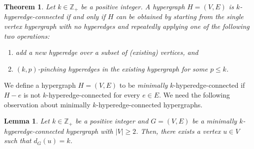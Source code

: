 \documentclass{article}
\def\Cref#1{<#1>}%
\newtheorem{lemma}{Lemma}[section]
\newtheorem{theorem}{Theorem}[section]
\providecommand{\Z}{\mathbb{Z}}
\begin{document}
\begin{theorem}\label{thm:k-EC-hypergraph-characterization}
    Let $k \in \Z_+$ be a positive integer. A hypergraph $H = (V, E)$ is $k$-hyperedge-connected if and only if $H$ can be obtained by starting from the single vertex hypergraph with no hyperedges and repeatedly applying one of the following two operations:
    \begin{enumerate}
        \item add a new hyperedge over a subset of (existing) vertices, and
        \item $(k, p)$-pinching hyperedges in the existing hypergraph for some $p \leq k$.
    \end{enumerate}
\end{theorem}
\fi
We define a hypergraph $H = (V, E)$ to be \emph{minimally} $k$-hyperedge-connected if $H-e$ is not $k$-hyperedge-connected for every $e\in E$. 
We need the following observation about minimally $k$-hyperedge-connected hypergraphs. %
\begin{lemma}\label{lem:minimally-k-EC-hypergraph-has-degree-k-vertex}
    Let $k \in \Z_+$ be a positive integer and $G = (V, E)$ be a minimally $k$-hyperedge-connected hypergraph with $|V| \geq 2$. Then, there exists a vertex $u \in V$ such that $d_G(u) = k$.
\end{lemma}
\end{document}
